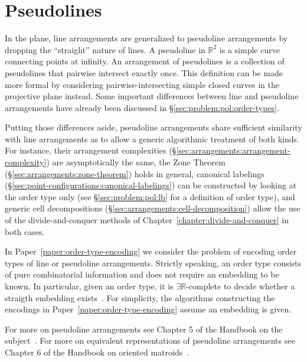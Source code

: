 \section{Pseudolines}

In the plane, line arrangements are generalized to pseudoline arrangements by
dropping the ``straight'' nature of lines.
%
A pseudoline in \(\mathbb{R}^2\) is a simple curve connecting points at
infinity.
An arrangement of pseudolines is a collection of pseudolines that pairwise
intersect exactly once.
%
This definition can be made more formal by considering pairwise-intersecting
simple closed curves in the projective plane instead.
%
Some important differences between line and pseudoline arrangements have
already been discussed in \S\ref{sec:problem:pol:order-types}.

Putting those differences aside, pseudoline arrangements share sufficient
similarity with line arrangements as to allow a generic algorithmic
treatment of both kinds.
%
For instance,
%
their arrangement complexities
(\S\ref{sec:arrangements:arrangement-complexity})
are
asymptotically the same,
%
the Zone Theorem (\S\ref{sec:arrangements:zone-theorem}) holds in general,
%
canonical labelings (\S\ref{sec:point-configurations:canonical-labelings})
can be constructed by looking at the order type only
(see \S\ref{sec:problem:pol:lb} for a definition of order type),
and generic cell decompositions
(\S\ref{sec:arrangements:cell-decomposition})
allow the use of the divide-and-conquer methods of
Chapter~\ref{chapter:divide-and-conquer} in both cases.

In Paper~\ref{paper:order-type-encoding} we consider the problem of encoding
order types of line or pseudoline arrangements.
%
Strictly speaking, an order type consists of pure combinatorial information and
does not require an embedding to be known.
%
In particular, given an order type, it is
\(\exists \mathbb{R}\)-complete to decide whether a straigth embedding
exists~\cite{Mne85,Mne88}.
%
For simplicity, the algorithms constructing the encodings in
Paper~\ref{paper:order-type-encoding} assume an embedding is given.

For more on pseudoline arrangements see Chapter
5 of the Handbook on the subject~\cite{Goo04}.
%
For more on equivalent representations of pseudoline arrangements see Chapter
6 of the Handbook on oriented matroids~\cite{RZ04}.


